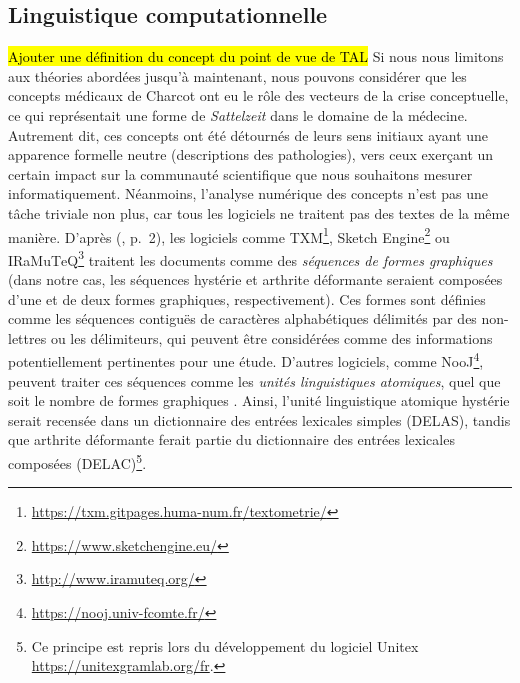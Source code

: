 \subsection{Linguistique computationnelle}
\hl{Ajouter une définition du concept du point de vue de TAL}
Si nous nous limitons aux théories abordées jusqu'à maintenant, nous pouvons considérer que les concepts médicaux de Charcot ont eu le rôle des vecteurs de la crise conceptuelle, ce qui représentait une forme de \textit{Sattelzeit} dans le domaine de la médecine. Autrement dit, ces concepts ont été détournés de leurs sens initiaux ayant une apparence formelle neutre (descriptions des pathologies), vers ceux exerçant un certain impact sur la communauté scientifique que nous souhaitons mesurer informatiquement. Néanmoins, l'analyse numérique des concepts n'est pas une tâche triviale non plus, car tous les logiciels ne traitent pas des textes de la même manière. D'après \citeauthor{silberztein2022linguistic} (\citeyear{silberztein2022linguistic}, p.~2), les logiciels comme \textsc{TXM}\footnote{\url{https://txm.gitpages.huma-num.fr/textometrie/}}, Sketch Engine\footnote{\url{https://www.sketchengine.eu/}} ou \textsc{IR}a\textsc{M}u\textsc{T}e\textsc{Q}\footnote{\url{http://www.iramuteq.org/}} traitent les documents comme des \textit{séquences de formes graphiques} (dans notre cas, les séquences \og{}hystérie\fg{} et \og{}arthrite déformante\fg{} seraient composées d'une et de deux formes graphiques, respectivement). Ces formes sont définies comme les séquences contiguës de caractères alphabétiques délimités par des non-lettres ou les délimiteurs, qui peuvent être considérées comme des informations potentiellement  pertinentes pour une étude. D'autres logiciels, comme \textsc{N}oo\textsc{J}\footnote{\url{https://nooj.univ-fcomte.fr/}}, peuvent traiter ces séquences comme les \textit{unités linguistiques atomiques}, quel que soit le nombre de formes graphiques \citep[pp.~2-3]{silberztein2022linguistic}. Ainsi, l'unité linguistique atomique \og{}hystérie\fg{} serait recensée dans un dictionnaire des entrées lexicales simples (\textsc{DELAS}), tandis que \og{}arthrite déformante\fg{} ferait partie du dictionnaire des entrées lexicales composées (\textsc{DELAC})\footnote{Ce principe est repris lors du développement du logiciel Unitex \url{https://unitexgramlab.org/fr}.}.

